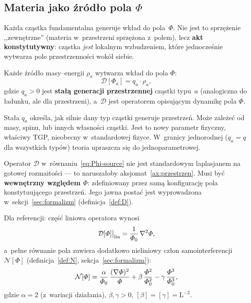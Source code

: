 \subsection{Materia jako \'zr\'od\l{}o pola $\Phi$}\label{ssec:zrodla}

Ka\.zda cz\k{a}stka fundamentalna generuje wk\l{}ad do pola~$\Phi$.
Nie jest to sprzężenie ,,zewn\k{e}trzne'' (materia w~przestrzeni
sprz\k{e}\.zona z~polem), lecz \textbf{akt konstytutywny}: cz\k{a}stka
\emph{jest} lokalnym wzbudzeniem, kt\'ore jednocze\'snie wytwarza
pole przestrzenno\'sci wok\'o\l{} siebie.

\begin{axiom}\label{ax:zrodlo}
Ka\.zde \'zr\'od\l{}o masy--energii $\rho_a$ wytwarza wk\l{}ad do pola $\Phi$:
\begin{equation}\label{eq:Phi-source}
    \mathcal{D}[\Phi_a] = q_a \cdot \rho_a,
\end{equation}
gdzie $q_a > 0$ jest \textbf{sta\l{}\k{a} generacji przestrzennej}
cz\k{a}stki typu~$a$ (analogiczna do \l{}adunku, ale dla przestrzeni),
a~$\mathcal{D}$ jest operatorem opisuj\k{a}cym dynamik\k{e} pola $\Phi$.
\end{axiom}

\begin{remark}
Sta\l{}a $q_a$ okre\'sla, jak silnie dany typ cz\k{a}stki generuje
przestrze\'n. Mo\.ze zale\.ze\'c od masy, spinu, lub innych w\l{}asno\'sci
cz\k{a}stki. Jest to nowy parametr fizyczny, w\l{}a\'sciwy TGP,
nieobecny w~standardowej fizyce. W~granicy jednorodnej
($q_a = q$ dla wszystkich typ\'ow) teoria upraszcza si\k{e}
do jednoparametrowej.
\end{remark}

\begin{remark}\label{rem:D-natura}
Operator $\mathcal{D}$ w~r\'ownaniu~\eqref{eq:Phi-source} nie jest
standardowym laplasjanem na gotowej rozmaito\'sci --- to
narusza\l{}oby aksjomat~\ref{ax:przestrzen}. Musi by\'c
\textbf{wewn\k{e}trzny wzgl\k{e}dem $\Phi$}: zdefiniowany
przez sam\k{a} konfiguracj\k{e} pola konstytuuj\k{a}cego
przestrze\'n. Jego jawna posta\'c jest wyprowadzona
w~sekcji~\ref{sec:formalizm} (definicja~\ref{def:D}).

Dla referencji: cz\k{e}\'s\'c liniowa operatora wynosi
\begin{equation}\label{eq:D-preview}
  \mathcal{D}[\varPhi]\big|_{\mathrm{lin}}
  = \frac{1}{\varPhi_0}\,\nabla^2\varPhi,
\end{equation}
a~pe\l{}ne r\'ownanie pola zawiera dodatkowo nieliniowy cz\l{}on
samointerferencji $\mathcal{N}[\Phi]$ (definicja~\ref{def:N},
sekcja~\ref{sec:formalizm}):
\begin{equation}\label{eq:N-preview}
  \mathcal{N}[\varPhi]
  = \frac{\alpha}{\varPhi_0}\,\frac{(\nabla\varPhi)^2}{\varPhi}
  + \beta\,\frac{\varPhi^2}{\varPhi_0^2}
  - \gamma\,\frac{\varPhi^3}{\varPhi_0^3},
\end{equation}
gdzie $\alpha = 2$ (z~wariacji dzia\l{}ania),
$\beta, \gamma > 0$, $[\beta] = [\gamma] = \mathrm{L}^{-2}$.
\end{remark}

